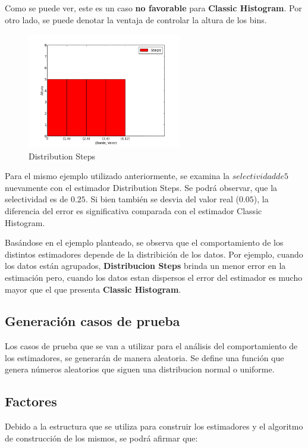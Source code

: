 \documentclass[10pt, a4paper,english,spanish,hidelinks]{article}
\begin{document}
{Como se puede ver, este es un caso \textbf{no favorable} para \textbf{Classic Histogram}. Por otro lado, se puede denotar la ventaja de controlar la altura de los bins.

\newpage
\begin{figure}[h!]
  \centering
  \includegraphics[width=0.6\textwidth]{./imagenes/ejb1_ejemplo_steps.png}
  \caption{Distribution Steps}
\end{figure}


Para el mismo ejemplo utilizado anteriormente, se examina la $selectividad de 5$ nuevamente con el estimador Distribution Steps.
Se podrá observar, que la selectividad es de $0.25$. Si bien también se desvia del
valor real ($0.05$), la diferencia del error es significativa comparada con el estimador Classic Histogram.


Basándose en el ejemplo planteado, se observa que el comportamiento de los distintos estimadores
depende de la distribición de los datos.
Por ejemplo, cuando los datos están agrupados, \textbf{Distribucion Steps} brinda un menor
error en la estimación pero, cuando los datos estan dispersos el error del estimador es
mucho mayor que el que presenta \textbf{Classic Histogram}.


\subsection{Generación casos de prueba}
Los casos de prueba que se van a utilizar para el análisis del comportamiento de los
estimadores, se generarán de manera aleatoria. Se define una función que genera números
aleatorios que siguen una distribucion normal o uniforme.

\subsection{Factores}

Debido a la estructura que se utiliza para construir los estimadores y el algoritmo de
construcción de los mismos, se podrá afirmar que:

}
\end{document}
